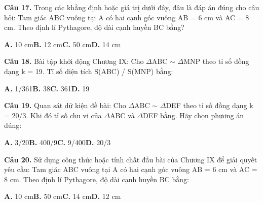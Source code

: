 \documentclass[11pt,a4paper]{article}
\begin{document}
\textbf{\color{primary} Câu 17.} Trong các khẳng định hoặc giá trị dưới đây, đâu là đáp án đúng cho câu hỏi: Tam giác ABC vuông tại A có hai cạnh góc vuông AB = 6 cm và AC = 8 cm. Theo định lí Pythagore, độ dài cạnh huyền BC bằng?\par
\hspace*{1.5em}\textbf{A.} 10 cm\quad\quad \textbf{B.} 12 cm\quad\quad \textbf{C.} 50 cm\quad\quad \textbf{D.} 14 cm\par\vspace{2pt}
\textbf{\color{primary} Câu 18.} Bài tập khởi động Chương IX: Cho $\Delta$ABC $\sim$ $\Delta$MNP theo tỉ số đồng dạng k = 19. Tỉ số diện tích S(ABC) / S(MNP) bằng:\par
\hspace*{1.5em}\textbf{A.} 1/361\quad\quad \textbf{B.} 38\quad\quad \textbf{C.} 361\quad\quad \textbf{D.} 19\par\vspace{2pt}
\textbf{\color{primary} Câu 19.} Quan sát dữ kiện đề bài: Cho $\Delta$ABC $\sim$ $\Delta$DEF theo tỉ số đồng dạng k = 20/3. Khi đó tỉ số chu vi của $\Delta$ABC và $\Delta$DEF bằng. Hãy chọn phương án đúng:\par
\hspace*{1.5em}\textbf{A.} 3/20\quad\quad \textbf{B.} 400/9\quad\quad \textbf{C.} 9/400\quad\quad \textbf{D.} 20/3\par\vspace{2pt}
\textbf{\color{primary} Câu 20.} Sử dụng công thức hoặc tính chất đầu bài của Chương IX để giải quyết yêu cầu: Tam giác ABC vuông tại A có hai cạnh góc vuông AB = 6 cm và AC = 8 cm. Theo định lí Pythagore, độ dài cạnh huyền BC bằng:\par
\hspace*{1.5em}\textbf{A.} 10 cm\quad\quad \textbf{B.} 50 cm\quad\quad \textbf{C.} 14 cm\quad\quad \textbf{D.} 12 cm\par\vspace{2pt}
\end{document}
